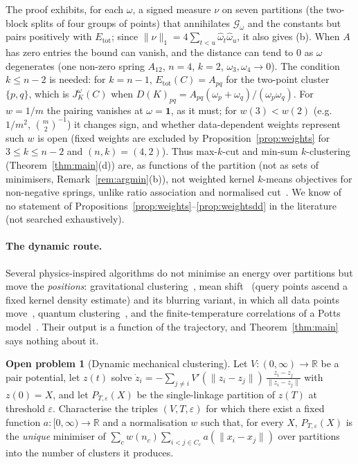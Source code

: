 \documentclass[11pt,a4paper]{article}
\theoremstyle{plain}
\theoremstyle{definition}
\newtheorem{problem}[theorem]{Open problem}
\theoremstyle{remark}
\newcommand{\R}{\mathbb{R}}
\newcommand{\tot}{\mathrm{tot}}
\newcommand{\one}{\mathbf 1}
\begin{document}
\noindent The proof exhibits, for each $\omega$, a signed measure $\nu$ on seven partitions (the two-block splits of four groups of points) that annihilates $\mathcal G_\omega$ and the constants but pairs positively with $E_\tot$; since $\lVert\nu\rVert_1=4\sum_{t<u}\hat\omega_t\hat\omega_u$, it also gives (b). When $A$ has zero entries the bound can vanish, and the distance can tend to $0$ as $\omega$ degenerates (one non-zero spring $A_{12}$, $n=4$, $k=2$, $\omega_3,\omega_4\to0$). The condition $k\le n-2$ is needed: for $k=n-1$, $E_\tot(C)=A_{pq}$ for the two-point cluster $\{p,q\}$, which is $J^\omega_K(C)$ when $D(K)_{pq}=A_{pq}(\omega_p+\omega_q)/(\omega_p\omega_q)$. For $w=1/m$ the pairing vanishes at $\omega=\one$, as it must; for $w(3)<w(2)$ (e.g.\ $1/m^2$, $\binom m2^{-1}$) it changes sign, and whether data-dependent weights represent such $w$ is open (fixed weights are excluded by Proposition~\ref{prop:weights} for $3\le k\le n-2$ and $(n,k)=(4,2)$). Thus max-$k$-cut and min-sum $k$-clustering (Theorem~\ref{thm:main}(d)) are, as functions of the partition (not as sets of minimisers, Remark~\ref{rem:argmin}(b)), not weighted kernel $k$-means objectives for non-negative springs, unlike ratio association and normalised cut~\citep{dhillon2007}. We know of no statement of Propositions~\ref{prop:weights}--\ref{prop:weightsdd} in the literature (not searched exhaustively).

\paragraph{The dynamic route.} Several physics-inspired algorithms do not minimise an energy over partitions but move the \emph{positions}: gravitational clustering~\citep{wright1977}, mean shift~\citep{fukunaga1975,comaniciu2002} (query points ascend a fixed kernel density estimate) and its blurring variant, in which all data points move~\citep{cheng1995}, quantum clustering~\citep{horn2002}, and the finite-temperature correlations of a Potts model~\citep{blatt1996}. Their output is a function of the trajectory, and Theorem~\ref{thm:main} says nothing about it.

\begin{problem}[Dynamic mechanical clustering]\label{prob:dyn}
Let $V\colon(0,\infty)\to\R$ be a pair potential, let $z(t)$ solve $\dot z_i=-\sum_{j\ne i}V'(\lVert z_i-z_j\rVert)\,\frac{z_i-z_j}{\lVert z_i-z_j\rVert}$ with $z(0)=X$, and let $P_{T,\varepsilon}(X)$ be the single-linkage partition of $z(T)$ at threshold $\varepsilon$. Characterise the triples $(V,T,\varepsilon)$ for which there exist a fixed function $a\colon[0,\infty)\to\R$ and a normalisation $w$ such that, for every $X$, $P_{T,\varepsilon}(X)$ is the \emph{unique} minimiser of $\sum_cw(n_c)\sum_{i<j\in C_c}a(\lVert x_i-x_j\rVert)$ over partitions into the number of clusters it produces.
\end{problem}
\end{document}
